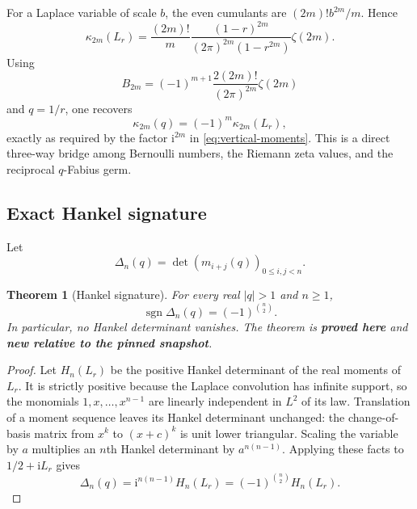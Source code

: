 \documentclass[11pt,oneside]{article}
\numberwithin{equation}{section}
\newtheorem{theorem}{Theorem}[section]
\theoremstyle{definition}
\theoremstyle{remark}
\newcommand{\sgn}{\operatorname{sgn}}
\newcommand{\ii}{\mathrm i}
\newcommand{\proved}{\textcolor{deepgreen}{\textbf{proved here}}}
\newcommand{\auditnew}{\textcolor{deepviolet}{\textbf{new relative to the pinned snapshot}}}
\begin{document}
For a Laplace variable of scale $b$, the even cumulants are
$(2m)!b^{2m}/m$.  Hence
\begin{equation}
 \kappa_{2m}(L_r)=
 \frac{(2m)!}{m}
 \frac{(1-r)^{2m}}{(2\pi)^{2m}(1-r^{2m})}\zeta(2m).
 \label{eq:Laplace-cumulants}
\end{equation}
Using
\begin{equation}
 B_{2m}=(-1)^{m+1}\frac{2(2m)!}{(2\pi)^{2m}}\zeta(2m)
 \label{eq:Bernoulli-zeta}
\end{equation}
and $q=1/r$, one recovers
\begin{equation}
 \kappa_{2m}(q)=(-1)^m\kappa_{2m}(L_r),
 \label{eq:vertical-cumulants}
\end{equation}
exactly as required by the factor $\ii^{2m}$ in
\eqref{eq:vertical-moments}.  This is a direct three-way bridge among
Bernoulli numbers, the Riemann zeta values, and the reciprocal $q$-Fabius
germ.

\subsection{Exact Hankel signature}

Let
\begin{equation}
 \Delta_n(q)=\det\left(m_{i+j}(q)\right)_{0\le i,j<n}.
 \label{eq:Hankel-q}
\end{equation}

\begin{theorem}[Hankel signature]
\label{thm:Hankel-signature}
For every real $|q|>1$ and $n\ge1$,
\begin{equation}
 \boxed{
 \sgn\Delta_n(q)=(-1)^{\binom n2}.}
 \label{eq:Hankel-signature}
\end{equation}
In particular, no Hankel determinant vanishes.  The theorem is \proved{} and
\auditnew.
\end{theorem}

\begin{proof}
Let $H_n(L_r)$ be the positive Hankel determinant of the real moments of
$L_r$.  It is strictly positive because the Laplace convolution has infinite
support, so the monomials $1,x,\ldots,x^{n-1}$ are linearly independent in
$L^2$ of its law.  Translation of a moment sequence leaves its Hankel
determinant unchanged: the change-of-basis matrix from $x^k$ to
$(x+c)^k$ is unit lower triangular.  Scaling the variable by $a$ multiplies an
$n$th Hankel determinant by $a^{n(n-1)}$.  Applying these facts to
$1/2+\ii L_r$ gives
\[
 \Delta_n(q)=\ii^{n(n-1)}H_n(L_r)
 =(-1)^{\binom n2}H_n(L_r).
\]
\end{proof}
\end{document}
